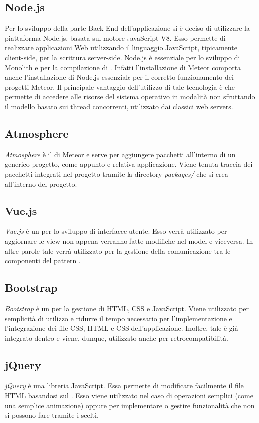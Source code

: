 \subsection{Node.js}
Per lo sviluppo della parte Back-End dell’applicazione si è deciso di utilizzare la piattaforma  Node.js, basata sul motore JavaScript V8. Esso permette di realizzare applicazioni
Web utilizzando il linguaggio JavaScript, tipicamente client-side, per
la scrittura server-side. 
Node.js è essenziale per lo sviluppo di Monolith e per la compilazione di . Infatti l'installazione di Meteor comporta anche l'installazione di Node.js essenziale per il corretto funzionamento dei progetti Meteor. Il principale vantaggio dell'utilizzo di tale tecnologia è che permette di accedere alle risorse del sistema operativo in modalità  non sfruttando il modello basato sui thread concorrenti, utilizzato dai classici web servers.

\subsection{Atmosphere}
\textit{Atmosphere} è il  di Meteor e serve per aggiungere pacchetti  all'interno di un generico progetto, come appunto  e relativa applicazione. Viene tenuta traccia dei pacchetti integrati nel progetto tramite la directory \textit{packages/} che si crea all'interno del progetto.

\subsection{Vue.js}
\textit{Vue.js} è un  per lo sviluppo di interfacce utente. Esso verrà utilizzato per aggiornare le view non appena verranno fatte modifiche nel model e viceversa. In altre parole tale  verrà utilizzato per la gestione della comunicazione tra le componenti del pattern .

\subsection{Bootstrap}
\textit{Bootstrap} è un  per la gestione di HTML, CSS e JavaScript. Viene utilizzato per semplicità di utilizzo e ridurre il tempo necessario per l'implementazione e l'integrazione dei file CSS, HTML e CSS dell'applicazione. Inoltre, tale  è già integrato dentro  e viene, dunque, utilizzato anche per retrocompatibilità.

\subsection{jQuery}
\textit{jQuery} è una libreria JavaScript. Essa permette di modificare facilmente il file HTML basandosi sul . Esso viene utilizzato nel caso di operazioni semplici (come una semplice animazione) oppure per implementare o gestire funzionalità che non si possono fare tramite i  scelti.